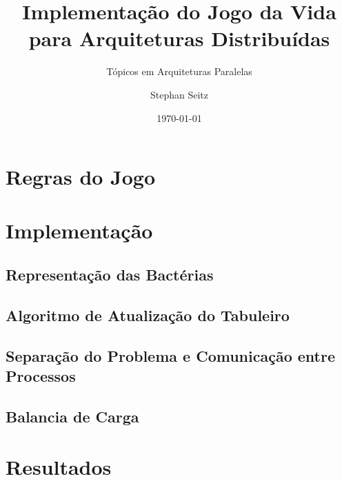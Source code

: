 \documentclass[
  oneside,
  11pt, a4paper,
  footinclude=true,
  headinclude=true,
  cleardoublepage=empty
]{scrartcl}
\title{Implementação do Jogo da Vida para Arquiteturas Distribuídas}
\subtitle{T\'opicos em Arquiteturas Paralelas}
\author{Stephan Seitz}
\date{\today}
\begin{document}
\maketitle
\tableofcontents
\newpage

\section{Regras do Jogo}


\section{Implementação}

\subsection{Representação das Bactérias}


\subsection{Algoritmo de Atualização do Tabuleiro}


\subsection{Separação do Problema e Comunicação entre Processos}


\subsection{Balancia de Carga}


\section{Resultados}


\newpage
\printbibliography
\end{document}
